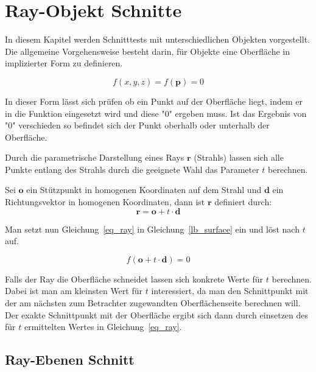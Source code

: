 \section{Ray-Objekt Schnitte}

In diesem Kapitel werden Schnitttests mit unterschiedlichen Objekten vorgestellt. Die allgemeine
Vorgehensweise besteht darin, für Objekte eine Oberfläche in implizierter Form zu definieren.

\begin{equation}
    f(x, y, z) = f(\mathbf{p}) = 0
    \label{lb_surface}
\end{equation}

In dieser Form lässt sich prüfen ob ein Punkt auf der Oberfläche liegt, indem er in die Funktion eingesetzt wird
und diese "0" ergeben muss. Ist das Ergebnis von "0" verschieden so befindet sich der Punkt oberhalb oder unterhalb der Oberfläche.

Durch die parametrische Darstellung eines Rays $\mathbf{r}$ (Strahls) lassen sich alle Punkte entlang des Strahls
durch die geeignete Wahl das Parameter $\mathit{t}$ berechnen. 

Sei $\mathbf{o}$ ein Stützpunkt in homogenen Koordinaten auf dem Strahl und $\mathbf{d}$ ein Richtungsvektor
in homogenen Koordinaten, dann ist $\mathbf{r}$ definiert durch:
\begin{equation}
    \mathbf{r} = \mathbf{o} + \mathit{t} \cdot \mathbf{d}
    \label{eq_ray}
\end{equation}


Man setzt nun Gleichung~\ref{eq_ray} in Gleichung~\ref{lb_surface} ein und löst nach $\mathit{t}$ auf.

\begin{equation}
    f(\mathbf{o} + \mathit{t} \cdot \mathbf{d}) = 0
\end{equation}

Falls der Ray die Oberfläche schneidet lassen sich konkrete Werte für $\mathit{t}$ berechnen. Dabei
ist man am kleinsten Wert für $\mathit{t}$ interessiert, da man den Schnittpunkt mit der am nächsten zum
Betrachter zugewandten Oberflächenseite berechnen will. Der exakte
Schnittpunkt mit der Oberfläche ergibt sich dann durch einsetzen des für $\mathit{t}$ ermittelten Wertes
in Gleichung~\ref{eq_ray}.


\subsection{Ray-Ebenen Schnitt}

